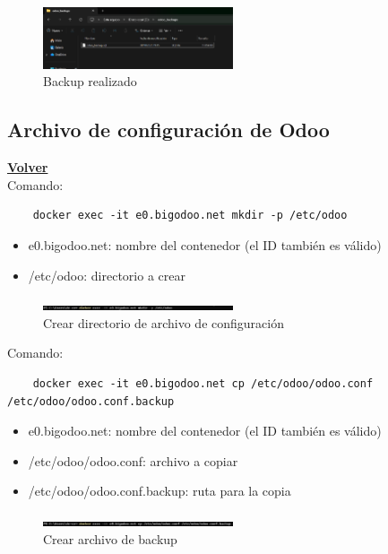 \documentclass[a4paper,12pt]{article}
\begin{document}
\begin{figure}[h!]
    \centering
    \includegraphics[width=0.5\textwidth]{pr2odoo81-backupRealizado.png}
    \caption{Backup realizado}
\end{figure}
\FloatBarrier

\subsection{Archivo de configuración de Odoo}
\hyperlink{anchor-indice}{\textbf{Volver}}\\

Comando: 
\begin{verbatim}
    docker exec -it e0.bigodoo.net mkdir -p /etc/odoo
\end{verbatim}

\begin{itemize}
    \item e0.bigodoo.net: nombre del contenedor (el ID también es válido)
    \item /etc/odoo: directorio a crear
\end{itemize}

\begin{figure}[h!]
    \centering
    \includegraphics[width=0.5\textwidth]{pr2odoo82-crearDirectorio.png}
    \caption{Crear directorio de archivo de configuración}
\end{figure}
\FloatBarrier

Comando: 
\begin{verbatim}
    docker exec -it e0.bigodoo.net cp /etc/odoo/odoo.conf /etc/odoo/odoo.conf.backup
\end{verbatim}

\begin{itemize}
    \item e0.bigodoo.net: nombre del contenedor (el ID también es válido)
    \item /etc/odoo/odoo.conf: archivo a copiar
    \item /etc/odoo/odoo.conf.backup: ruta para la copia
\end{itemize}

\begin{figure}[h!]
    \centering
    \includegraphics[width=0.5\textwidth]{pr2odoo83-crearBackup.png}
    \caption{Crear archivo de backup}
\end{figure}
\FloatBarrier
\end{document}
